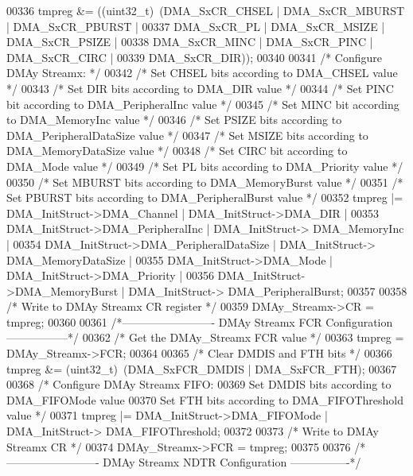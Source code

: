 \begin{DoxyCode}
00336   tmpreg &= ((uint32\_t)~(DMA_SxCR_CHSEL | DMA_SxCR_MBURST | DMA_SxCR_PBURST |
00337                          DMA_SxCR_PL | DMA_SxCR_MSIZE | DMA_SxCR_PSIZE |
00338                          DMA_SxCR_MINC | DMA_SxCR_PINC | DMA_SxCR_CIRC |
00339                          DMA_SxCR_DIR));
00340 
00341   \textcolor{comment}{/* Configure DMAy Streamx: */}
00342   \textcolor{comment}{/* Set CHSEL bits according to DMA\_CHSEL value */}
00343   \textcolor{comment}{/* Set DIR bits according to DMA\_DIR value */}
00344   \textcolor{comment}{/* Set PINC bit according to DMA\_PeripheralInc value */}
00345   \textcolor{comment}{/* Set MINC bit according to DMA\_MemoryInc value */}
00346   \textcolor{comment}{/* Set PSIZE bits according to DMA\_PeripheralDataSize value */}
00347   \textcolor{comment}{/* Set MSIZE bits according to DMA\_MemoryDataSize value */}
00348   \textcolor{comment}{/* Set CIRC bit according to DMA\_Mode value */}
00349   \textcolor{comment}{/* Set PL bits according to DMA\_Priority value */}
00350   \textcolor{comment}{/* Set MBURST bits according to DMA\_MemoryBurst value */}
00351   \textcolor{comment}{/* Set PBURST bits according to DMA\_PeripheralBurst value */}
00352   tmpreg |= DMA\_InitStruct->DMA_Channel | DMA\_InitStruct->DMA_DIR |
00353             DMA\_InitStruct->DMA_PeripheralInc | DMA\_InitStruct->
      DMA_MemoryInc |
00354             DMA\_InitStruct->DMA_PeripheralDataSize | DMA\_InitStruct->
      DMA_MemoryDataSize |
00355             DMA\_InitStruct->DMA_Mode | DMA\_InitStruct->DMA_Priority |
00356             DMA\_InitStruct->DMA_MemoryBurst | DMA\_InitStruct->
      DMA_PeripheralBurst;
00357 
00358   \textcolor{comment}{/* Write to DMAy Streamx CR register */}
00359   DMAy\_Streamx->CR = tmpreg;
00360 
00361   \textcolor{comment}{/*------------------------- DMAy Streamx FCR Configuration -----------------*/}
00362   \textcolor{comment}{/* Get the DMAy\_Streamx FCR value */}
00363   tmpreg = DMAy\_Streamx->FCR;
00364 
00365   \textcolor{comment}{/* Clear DMDIS and FTH bits */}
00366   tmpreg &= (uint32\_t)~(DMA_SxFCR_DMDIS | DMA_SxFCR_FTH);
00367 
00368   \textcolor{comment}{/* Configure DMAy Streamx FIFO: }
00369 \textcolor{comment}{    Set DMDIS bits according to DMA\_FIFOMode value }
00370 \textcolor{comment}{    Set FTH bits according to DMA\_FIFOThreshold value */}
00371   tmpreg |= DMA\_InitStruct->DMA_FIFOMode | DMA\_InitStruct->
      DMA_FIFOThreshold;
00372 
00373   \textcolor{comment}{/* Write to DMAy Streamx CR */}
00374   DMAy\_Streamx->FCR = tmpreg;
00375 
00376   \textcolor{comment}{/*------------------------- DMAy Streamx NDTR Configuration ----------------*/}

\end{DoxyCode}
